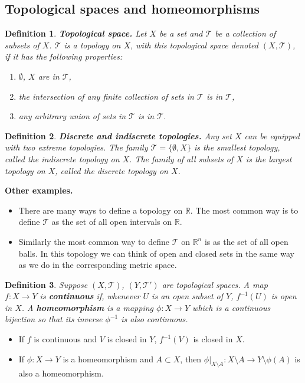\documentclass[two column]{article}
\newtheorem{definition}{Definition}[subsection]
\begin{document}
\subsection{Topological spaces and homeomorphisms}

\begin{definition}
{\bf Topological space.} Let $X$ be a set and $\mathcal{T}$ be a collection of subsets of $X$. $\mathcal{T}$ is a topology on $X$, with this topological space denoted $(X,\mathcal{T})$, if it has the following properties:
\begin{enumerate}
\item $\emptyset$, $X$ are in $\mathcal{T}$,
\item the intersection of any finite collection of sets in $\mathcal{T}$ is in $\mathcal{T}$,
\item any arbitrary union of sets in $\mathcal{T}$ is in $\mathcal{T}$. \\
\end{enumerate}
\end{definition}

\begin{definition}
{\bf Discrete and indiscrete topologies.} Any set $X$ can be equipped with two extreme topologies. The family $\mathcal{T} = \{ \emptyset, X \}$ is the smallest topology, called the \emph{indiscrete topology} on $X$. The family of all subsets of $X$ is the largest topology on $X$, called the \emph{discrete topology} on $X$. \vspace{6pt}  
\end{definition}

{\bf Other examples.} 
\begin{itemize}
\item There are many ways to define a topology on $\mathbb{R}$. The most common way is to define $\mathcal{T}$ as the set of all open intervals on $\mathbb{R}$.
\item Similarly the most common way to define $\mathcal{T}$ on $\mathbb{R}^{n}$ is as the set of all open balls. In this topology we can think of open and closed sets in the same way as we do in the corresponding metric space. \\
\end{itemize}

\begin{definition}
Suppose $(X, \mathcal{T})$, $(Y, \mathcal{T}')$ are topological spaces. A map $f:X \rightarrow Y$ is {\bf continuous} if, whenever $U$ is an open subset of $Y$, $f^{-1}(U)$ is open in $X$. A {\bf homeomorphism} is a mapping $\phi: X \rightarrow Y$ which is a continuous bijection so that its inverse $\phi^{-1}$ is also continuous.  
\end{definition}
\begin{itemize}
\item If $f$ is continuous and $V$ is closed in $Y$, $f^{-1}(V)$ is closed in $X$. \vspace{-5pt}
\item If $\phi : X \rightarrow Y$ is a homeomorphism and $A \subset X$, then $\phi \vert_{X \setminus A} : X \setminus A \rightarrow Y \setminus \phi(A)$ is also a homeomorphism. 
\end{itemize}
\end{document}
